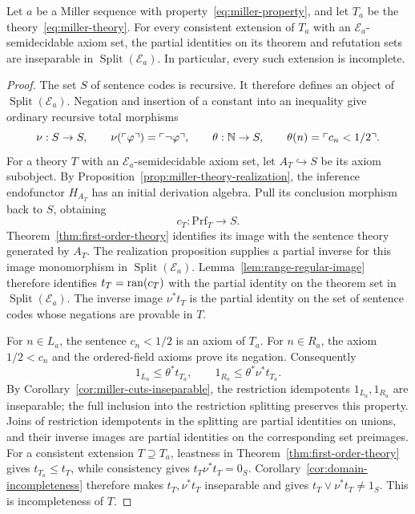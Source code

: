 \begin{theorem}\label{thm:miller-incompleteness}
Let $a$ be a Miller sequence with property~\eqref{eq:miller-property},
and let $T_a$ be the theory~\eqref{eq:miller-theory}.
For every consistent extension of $T_a$ with an
$\mathcal E_a$-semidecidable axiom set, the partial identities on its
theorem and refutation sets are inseparable in
$\operatorname{Split}(\mathcal E_a)$.
In particular, every such extension is incomplete.
\end{theorem}
\begin{proof}
The set $S$ of sentence codes is recursive. It therefore defines an
object of $\operatorname{Split}(\mathcal E_a)$. Negation and insertion
of a constant into an inequality give ordinary recursive total morphisms
\[
 \nu:S\to S,\qquad
 \nu(\ulcorner\varphi\urcorner)=\ulcorner\neg\varphi\urcorner,
 \qquad
 \theta:\mathbb N\to S,\qquad
 \theta(n)=\ulcorner c_n<1/2\urcorner.
\]
For a theory $T$ with an $\mathcal E_a$-semidecidable axiom set,
let $A_T\hookrightarrow S$ be its axiom subobject. By
Proposition~\ref{prop:miller-theory-realization}, the inference
endofunctor $H_{A_T}$ has an initial derivation algebra. Pull its
conclusion morphism back to $S$, obtaining
\[
 c_T:\mathrm{Prf}_T\to S.
\]
Theorem~\ref{thm:first-order-theory} identifies its image with the
sentence theory generated by $A_T$. The realization proposition
supplies a partial inverse for this image monomorphism in
$\operatorname{Split}(\mathcal E_a)$.
Lemma~\ref{lem:range-regular-image} therefore identifies
$t_T=\operatorname{ran}(c_T)$ with the partial identity on the theorem set in
$\operatorname{Split}(\mathcal E_a)$.
The inverse image $\nu^*t_T$ is the partial identity on the set of
sentence codes whose negations are provable in $T$.

For $n\in L_a$, the sentence $c_n<1/2$ is an axiom of $T_a$.
For $n\in R_a$, the axiom $1/2<c_n$ and the ordered-field axioms
prove its negation. Consequently
\[
 1_{L_a}\le\theta^*t_{T_a},\qquad
 1_{R_a}\le\theta^*\nu^*t_{T_a}.
\]
By Corollary~\ref{cor:miller-cuts-inseparable}, the restriction idempotents
$1_{L_a},1_{R_a}$ are inseparable; the full inclusion into the restriction
splitting preserves this property. Joins of restriction idempotents in
the splitting are partial identities on unions, and their inverse images
are partial identities on the corresponding set preimages.
For a consistent extension $T\supseteq T_a$, leastness in
Theorem~\ref{thm:first-order-theory} gives $t_{T_a}\le t_T$,
while consistency gives $t_T\nu^*t_T=0_S$.
Corollary~\ref{cor:domain-incompleteness} therefore makes
$t_T,\nu^*t_T$ inseparable and gives
$t_T\vee\nu^*t_T\ne1_S$. This is incompleteness of $T$.
\end{proof}
